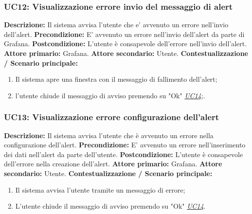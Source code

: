                 \subsubsection{UC12: Visualizzazione errore invio del messaggio di alert}
                    \textbf{Descrizione:} Il sistema avvisa l'utente che e’ avvenuto un errore nell'invio dell'alert.
                    \newline
                    \textbf{Precondizione:} E’ avvenuto un errore nell'invio dell'alert da parte di Grafana.
                    \newline
                    \textbf{Postcondizione:} L’utente è consapevole dell'errore nell'invio dell'alert.
                    \newline
                    \textbf{Attore primario:} Grafana.
                    \newline
                    \textbf{Attore secondario:} Utente.
                    \newline
                    \textbf{Contestualizzazione / Scenario principale:} \begin{enumerate}
                            \item Il sistema apre una finestra con il messaggio di fallimento dell'alert;
                            \item l'utente chiude il messaggio di avviso premendo su "Ok" \underline{\textit{UC14}};.
                        \end{enumerate}
                        
                \subsubsection{UC13: Visualizzazione errore configurazione dell'alert}
                    \textbf{Descrizione:} Il sistema avvisa l’utente che è avvenuto un errore nella configurazione dell'alert.
                    \newline
                    \textbf{Precondizione:} E' avvenuto un errore nell'inserimento dei dati nell'alert da parte dell'utente.
                    \newline
                    \textbf{Postcondizione:} L’utente è consapevole dell'errore nella creazione dell'alert.
                    \newline
                    \textbf{Attore primario:} Grafana.
                    \newline
                    \textbf{Attore secondario:} Utente.
                    \newline
                    \textbf{Contestualizzazione / Scenario principale:} \begin{enumerate}
                            \item Il sistema avvisa l’utente tramite un messaggio di errore;
                            \item L'utente chiude il messaggio di avviso premendo su "Ok" \underline{\textit{UC14}}.
                        \end{enumerate}
                        
